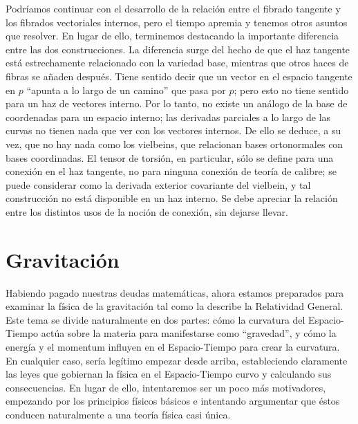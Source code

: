 \documentclass[11pt,b5paper,openany,twoside]{book}
\begin{document}
Podríamos continuar con el desarrollo de la relación entre el fibrado tangente y los fibrados vectoriales internos, pero el tiempo apremia y tenemos otros asuntos que resolver.
En lugar de ello, terminemos destacando la importante diferencia entre las dos construcciones.
La diferencia surge del hecho de que el haz tangente está estrechamente relacionado con la variedad base, mientras que otros haces de fibras se añaden después.
Tiene sentido decir que un vector en el espacio tangente en $p$ ``apunta a lo largo de un camino'' que pasa por $p$; pero esto no tiene sentido para un haz de vectores interno.
Por lo tanto, no existe un análogo de la base de coordenadas para un espacio interno; las derivadas parciales a lo largo de las curvas no tienen nada que ver con los vectores internos.
De ello se deduce, a su vez, que no hay nada como los vielbeins, que relacionan bases ortonormales con bases coordinadas.
El tensor de torsión, en particular, sólo se define para una conexión en el haz tangente, no para ninguna conexión de teoría de calibre; se puede considerar como la derivada exterior covariante del vielbein, y tal construcción no está disponible en un haz interno.
Se debe apreciar la relación entre los distintos usos de la noción de conexión, sin dejarse llevar.





\chapter{Gravitación}



Habiendo pagado nuestras deudas matemáticas, ahora estamos preparados para examinar la física de la gravitación tal como la describe la Relatividad General.
Este tema se divide naturalmente en dos partes: cómo la curvatura del Espacio-Tiempo actúa sobre la materia para manifestarse como ``gravedad'', y cómo la energía y el momentum influyen en el Espacio-Tiempo para crear la curvatura.
En cualquier caso, sería legítimo empezar desde arriba, estableciendo claramente las leyes que gobiernan la física en el Espacio-Tiempo curvo y calculando sus consecuencias.
En lugar de ello, intentaremos ser un poco más motivadores, empezando por los principios físicos básicos e intentando argumentar que éstos conducen naturalmente a una teoría física casi única.
\end{document}

